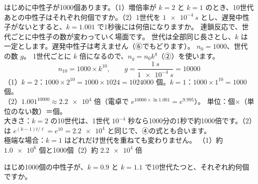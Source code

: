 \label{ph:原-15:ex3}
\begin{phreidai}[増倍率と世代の数]
はじめに中性子が1000個あります。（1）増倍率が $k=2$ と $k=1$ のとき、10世代あとの中性子はそれぞれ何個ですか。（2）1世代を $\qty{1e-4}{s}$ とし、遅発中性子がないとすると、$k=1.001$ で1秒後には何倍になりますか。
\phbamen
連鎖反応で、世代ごとに中性子の数が変わっていく場面です。
\phmushi
世代は全部同じ長さとし、$k$ は一定とします。遅発中性子は考えません（⑥でもどります）。
\phzu
$n_0=1000$、世代の数 $g$。
\phriyu
1世代ごとに $k$ 倍になるので、$n_g=n_0k^g$（②）を使います。
\phtateru
\[ n_{10}=1000\times k^{10},\qquad g=\frac{\qty{1}{s}}{\qty{1e-4}{s}}=\num{10000} \]
\phtoku
（1）$k=2$：$1000\times2^{10}=1000\times1024=\num{1024000}$ 個。$k=1$：$1000\times1^{10}=1000$ 個。\\
（2）$1.001^{10000}\approx\num{2.2e4}$ 倍（電卓で $e^{10000\times\ln1.001}=e^{9.995}$）。
\phtashikame
単位：個×（単位のない数）＝個。\\
大きさ：$k=2$ の10世代は、1世代 $10^{-4}$ 秒なら1000分の1秒で約1000倍です。（2）は $e^{(k-1)t/\ell}=e^{10}=\num{2.2e4}$ と同じで、④の式とも合います。\\
極端な場合：$k=1$ はどれだけ世代を重ねても変わりません。
\kotae （1）約 $\num{1.0e6}$ 個と1000個（2）約 $\num{2.2e4}$ 倍
\end{phreidai}
\begin{jibun}
はじめ1000個の中性子が、$k=0.9$ と $k=1.1$ で10世代たつと、それぞれ約何個ですか。
\end{jibun}

